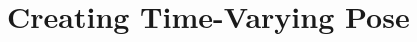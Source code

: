 \documentclass[12pt,a4paper]{article}
\begin{document}
	
	\section{Creating Time-Varying Pose}
\end{document}
